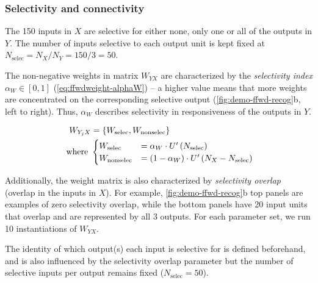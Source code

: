 \subsubsection*{Selectivity and connectivity}

The 150 inputs in $X$ are selective for either none, only one or all of the outputs in $Y$.
    The number of inputs selective to each output unit is kept fixed at
        $N_{\text{selec}}=N_X/N_Y=150/3 = 50$.

The non-negative weights in matrix $W_{YX}$ are characterized by the \textit{selectivity index}
    $\alpha_W \in [0,1]$ (\autoref{eq:ffwdweight-alphaW})
    -- a higher value means that more weights are concentrated on the corresponding selective output (\autoref{fig:demo-ffwd-recog}b, left to right).
    Thus, $\alpha_W$ describes selectivity in responsiveness of the outputs in $Y$.

\vspace{1em}
\begin{equation}
    \label{eq:ffwdweight-alphaW}
    \begin{aligned}
        W_{Y_j X} &= \left\{
                W_{\mathrm{selec}},
                W_{\mathrm{nonselec}}
                \right\} \\
            \text{ where } &
            \begin{cases}
                W_{\mathrm{selec}} &=
                    \alpha_W
                    \cdot
                    U^{\prime}\left(N_{\text{selec}}\right) \\
                W_{\mathrm{nonselec}} &=
                    (1 - \alpha_W)
                    \cdot
                    U^{\prime}\left(N_X - N_{\text{selec}}\right)
            \end{cases}
    \end{aligned}
\end{equation}


Additionally, the weight matrix is also characterized by \textit{selectivity overlap}
    (overlap in the inputs in $X$).
    For example, \autoref{fig:demo-ffwd-recog}b top panels are examples of zero selectivity overlap,
        while the bottom panels have 20 input units that overlap and are represented by all 3 outputs.
    For each parameter set, we run 10 instantiations of $W_{YX}$.

The identity of which output(s) each input is selective for is defined beforehand,
    and is also influenced by the selectivity overlap parameter
    but the number of selective inputs per output remains fixed ($N_{\text{selec}}=50$).

